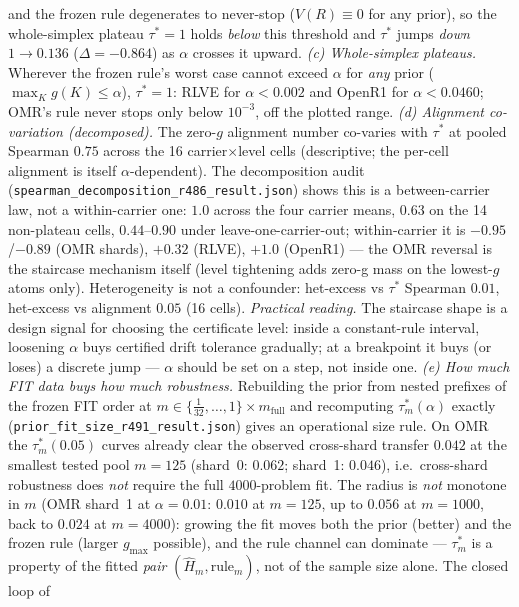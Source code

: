 \documentclass{article}
\theoremstyle{definition}
\theoremstyle{remark}
\begin{document}
and the frozen rule degenerates to never-stop ($V(R)\equiv0$ for any
prior), so the whole-simplex plateau $\tau^*=1$ holds \emph{below} this
threshold and $\tau^*$ jumps \emph{down} $1\!\to\!0.136$
($\Delta=-0.864$) as $\alpha$ crosses it upward. \emph{(c) Whole-simplex plateaus.}
Wherever the frozen rule's worst case cannot exceed $\alpha$ for
\emph{any} prior ($\max_K g(K)\le\alpha$), $\tau^*=1$: RLVE for
$\alpha<0.002$ and OpenR1 for $\alpha<0.0460$; OMR's rule never stops
only below $10^{-3}$, off the plotted range. \emph{(d) Alignment
co-variation (decomposed).} The zero-$g$ alignment number co-varies with
$\tau^*$ at pooled Spearman $0.75$ across the 16 carrier$\times$level
cells (descriptive; the per-cell alignment is itself $\alpha$-dependent).
The decomposition audit
(\texttt{spearman\_decomposition\_r486\_result.json}) shows this is a
between-carrier law, not a within-carrier one: $1.0$ across the four
carrier means, $0.63$ on the 14 non-plateau cells, $0.44$--$0.90$ under
leave-one-carrier-out; within-carrier it is $-0.95$/$-0.89$ (OMR shards),
$+0.32$ (RLVE), $+1.0$ (OpenR1) --- the OMR reversal is the staircase
mechanism itself (level tightening adds zero-g mass on the lowest-$g$
atoms only). Heterogeneity is not a confounder: het-excess vs $\tau^*$
Spearman $0.01$, het-excess vs alignment $0.05$ (16 cells).
\emph{Practical reading.} The staircase shape is a design signal for
choosing the certificate level: inside a constant-rule interval,
loosening $\alpha$ buys certified drift tolerance gradually; at a
breakpoint it buys (or loses) a discrete jump --- $\alpha$ should be set
on a step, not inside one.
\emph{(e) How much FIT data buys how much robustness.} Rebuilding the
prior from nested prefixes of the frozen FIT order at
$m\in\{\tfrac{1}{32},\dots,1\}\times m_{\mathrm{full}}$ and recomputing
$\tau^*_m(\alpha)$ exactly
(\texttt{prior\_fit\_size\_r491\_result.json}) gives an operational size
rule. On OMR the $\tau^*_m(0.05)$ curves already clear the observed
cross-shard transfer $0.042$ at the smallest tested pool $m{=}125$
(shard~0: $0.062$; shard~1: $0.046$), i.e.\ cross-shard robustness does
\emph{not} require the full $4000$-problem fit. The radius is
\emph{not} monotone in $m$ (OMR shard~1 at $\alpha=0.01$: $0.010$ at
$m{=}125$, up to $0.056$ at $m{=}1000$, back to $0.024$ at $m{=}4000$):
growing the fit moves both the prior (better) and the frozen rule
(larger $g_{\max}$ possible), and the rule channel can dominate ---
$\tau^*_m$ is a property of the fitted \emph{pair} $(\widehat H_m,
\text{rule}_m)$, not of the sample size alone. The closed loop of
\end{document}
